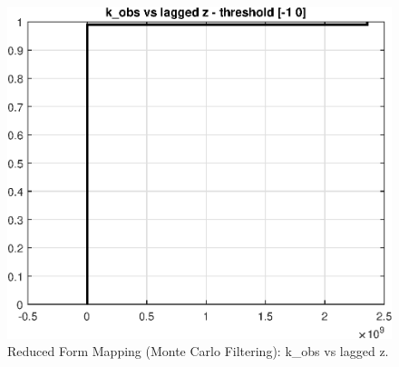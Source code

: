 
\begin{figure}[H]
\centering 
\includegraphics[width=1.00\textwidth]{RBC_kz/gsa/redform_prior/k_obs_vs_z_threshold/RBC_kz_prior_k_obs_vs_z}
\caption{Reduced Form Mapping (Monte Carlo Filtering): k\_obs vs lagged z.}\label{Fig:prior_k_obs_vs_z}
\end{figure}

